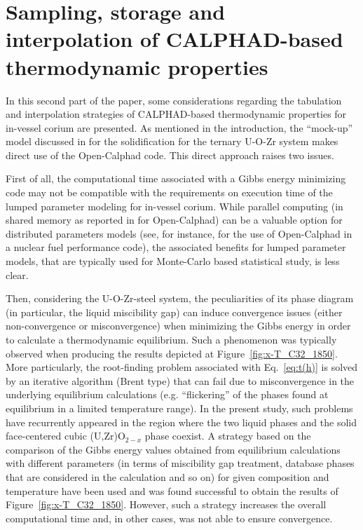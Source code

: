 \documentclass[11pt]{article}\usepackage{geometry} \geometry{letterpaper, margin=25.4mm}
\newcommand{\Eq}[1]{Eq.~\ref{eq:#1}}
\newcommand{\Fig}[1]{Figure~\ref{fig:#1}}
\begin{document}


\section{Sampling, storage and interpolation of CALPHAD-based thermodynamic properties} \label{sect:practical}

In this second part of the paper, some considerations regarding the tabulation and interpolation strategies of CALPHAD-based thermodynamic properties for in-vessel corium are presented. As mentioned in the introduction, the ``mock-up'' model discussed in \cite{Tiwari2018} for the solidification for the ternary U-O-Zr system makes direct use of the Open-Calphad code. This direct approach raises two issues. 

First of all, the computational time associated with a Gibbs energy minimizing code may not be compatible with the requirements on execution time of the lumped parameter modeling for in-vessel corium. While parallel computing (in shared memory as reported in \cite{Sundman2016} for Open-Calphad) can be a valuable option for distributed parameters models (see, for instance, \cite{Introini2018} for the use of Open-Calphad in a nuclear fuel performance code), the associated benefits for lumped parameter models, that are typically used for Monte-Carlo based statistical study, is less clear. 

Then, considering the U-O-Zr-steel system, the peculiarities of its phase diagram (in particular, the liquid miscibility gap) can induce convergence issues (either non-convergence or misconvergence) when minimizing the Gibbs energy in order to calculate a thermodynamic equilibrium. Such a phenomenon was typically observed when producing the results depicted at \Fig{x-T_C32_1850}. More particularly, the root-finding problem associated with \Eq{t(h)} is solved by an iterative algorithm (Brent type) that can fail due to misconvergence in the underlying equilibrium calculations (e.g. ``flickering'' of the phases found at equilibrium in a limited temperature range). In the present study, such problems have recurrently appeared in the region where the two liquid phases and the solid face-centered cubic (U,Zr)O$_{2-x}$ phase coexist. A strategy based on the comparison of the Gibbs energy values obtained from equilibrium calculations with different parameters (in terms of miscibility gap treatment, database phases that are considered in the calculation and so on) for given composition and temperature have been used and was found successful to obtain the results of \Fig{x-T_C32_1850}. However, such a strategy increases the overall computational time and, in other cases, was not able to ensure convergence.
\end{document}
